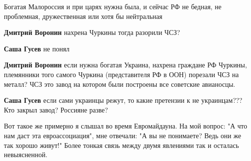 \begin{itemize}
\begin{itemize}
Богатая Малороссия и при царях нужна была, и сейчас РФ не бедная, не проблемная, дружественная или хотя бы нейтральная

 
\textbf{Дмитрий Воронин} нахрена Чуркины тогда разорили ЧСЗ?

 
\textbf{Саша Гусев} не понял

 
\textbf{Дмитрий Воронин} если нужна богатая Украина, нахрена граждане РФ Чуркины, племянники того самого Чуркина (представителя РФ в ООН) порезали ЧСЗ на металл?
ЧСЗ это завод на котором были построены все советские авианосцы.

 
\textbf{Саша Гусев} если сами украинцы режут, то какие претензии к не украинцам???
Кто закрыл завод? Россияне разве?
\end{itemize}

 

Вот такое же примерно я слышал во время Евромайдауна. На мой вопрос: "А что нам
даст эта евроассоциация", мне отвечали: "А вы не понимаете? Ведь они же так
хорошо живут!" Более тонкая связь между двумя явлениями так и осталась
невыясненной.


 

\end{itemize}
